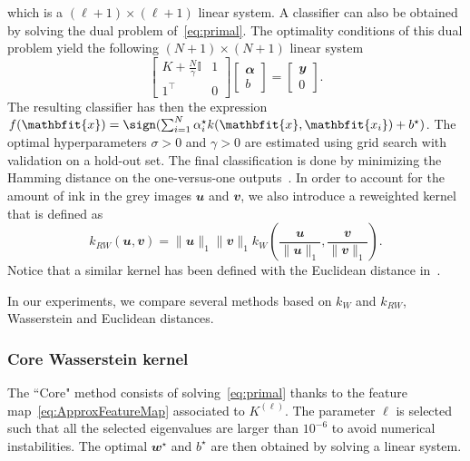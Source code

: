 which is a $(\ell+1)\times (\ell+1)$ linear system.
A classifier can also be obtained by solving the dual problem of~\eqref{eq:primal}. The optimality conditions of this dual problem yield the following $(N+1)\times (N+1)$ linear system
\begin{equation}
\begin{bmatrix}
        K + \frac{N}{\gamma}\mathbb{I} & \mathbfit{1}\\
    \mathbfit{1}^\top & 0
\end{bmatrix}
\begin{bmatrix}
\mathbfit{\alpha}\\
b
\end{bmatrix}
 = \begin{bmatrix}
\mathbfit{y}\\
0
\end{bmatrix}.\label{eq:dual}
\end{equation}
The resulting classifier has then the expression $f(\mathbfit{x}) = \sign(\sum_{i=1}^N \alpha_i^\star k(\mathbfit{x},\mathbfit{x_i}) +b^\star)$.
The optimal hyperparameters $\sigma>0$ and $\gamma>0$ are estimated using grid search with validation on a hold-out set. The final classification is done by minimizing the Hamming distance on the one-versus-one outputs~\cite{mlssvm}.
In order to account for the amount of ink  in the grey images $\mathbfit{u}$ and $\mathbfit{v}$, we also introduce a  reweighted kernel that is defined as
\begin{equation}
k_{RW}(\mathbfit{u},\mathbfit{v}) = \|\mathbfit{u}\|_1 \|\mathbfit{v}\|_1 k_W\left(\frac{\mathbfit{u}}{\|\mathbfit{u}\|_1},\frac{\mathbfit{v}}{\|\mathbfit{v}\|_1}\right).\label{eq:kernelRescaled}
\end{equation} Notice that a similar kernel has been defined with the Euclidean distance in~\cite{Mairal2016,Mairal}.

In our experiments, we compare several methods based on $k_W$ and $k_{RW}$, Wasserstein and Euclidean distances.
\subsubsection{Core Wasserstein kernel}
The ``Core" method consists of solving~\eqref{eq:primal} thanks to the feature map~\eqref{eq:ApproxFeatureMap} associated to $K^{(\ell)}$. The parameter $\ell$ is selected such that all the selected eigenvalues are larger than $10^{-6}$ to avoid numerical instabilities. The optimal $\mathbfit{w}^\star$ and $b^\star$ are then obtained by solving a linear system.


